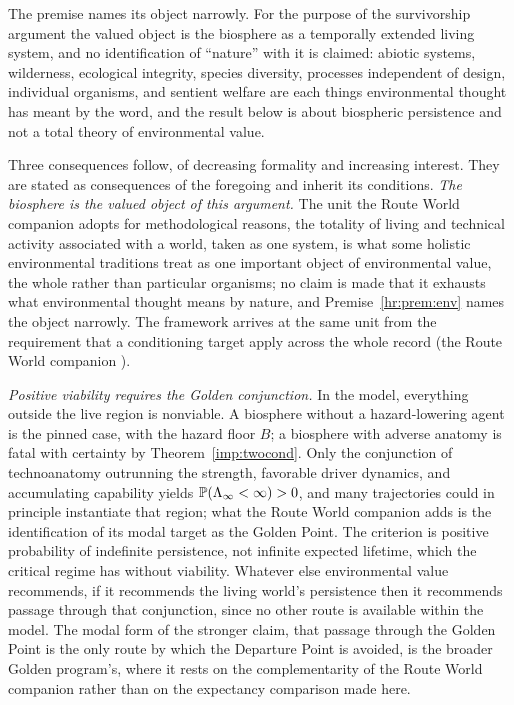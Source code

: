 \noindent The premise names its object narrowly. For the purpose of the
survivorship argument the valued object is the biosphere as a
temporally extended living system, and no identification of ``nature''
with it is claimed: abiotic systems, wilderness, ecological integrity,
species diversity, processes independent of design, individual
organisms, and sentient welfare are each things environmental thought
has meant by the word, and the result below is about biospheric
persistence and not a total theory of environmental value.

Three consequences follow, of decreasing formality and increasing
interest. They are stated as consequences of the foregoing and inherit
its conditions. \emph{The biosphere is the valued object of this argument.} The unit
the Route World companion \cite{GoldenRouteWorld} adopts for methodological reasons, the totality of
living and technical activity associated with a world, taken as one
system, is what some holistic environmental traditions treat as one
important object of environmental value, the whole rather than
particular organisms; no claim is made that it exhausts what
environmental thought means by nature, and Premise~\ref{hr:prem:env}
names the object narrowly. The framework arrives at the same unit from
the requirement that a conditioning target apply across the whole record
(the Route World companion \cite{GoldenRouteWorld}).

\emph{Positive viability requires the Golden conjunction.} In the model,
everything outside the live region is nonviable. A biosphere without a
hazard-lowering agent is the pinned case, with the hazard floor
$B$; a biosphere with adverse anatomy is fatal with certainty by
Theorem~\ref{imp:twocond}. Only the conjunction of technoanatomy outrunning the strength,
favorable driver dynamics, and accumulating capability yields
$\mathbb{P}(\Lambda_\infty<\infty)>0$, and many trajectories could in
principle instantiate that region; what the Route World companion adds
is the identification of its modal target as the Golden Point. The
criterion is positive probability of indefinite persistence, not
infinite expected lifetime, which the critical regime has without
viability. Whatever else environmental value
recommends, if it recommends the living world's persistence then it
recommends passage through that conjunction, since no other route is
available within the model. The modal form of the stronger claim, that
passage through the Golden Point is the only route by which the
Departure Point is avoided, is the broader Golden program's, where it rests on the complementarity of
the Route World companion \cite{GoldenRouteWorld} rather than on the expectancy comparison made
here.

